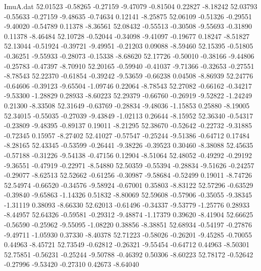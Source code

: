 \begin{filecontents}{ImuA.dat}
  52.01523   -0.58265   -0.27159   -9.47079   -0.81504    0.22827   -8.18242
  52.03793   -0.55633   -0.27159   -9.48635   -0.74634    0.12141   -8.25875
  52.06109   -0.51326   -0.29551   -9.40020   -0.54789    0.11378   -8.36561
  52.08432   -0.55513   -0.30508   -9.55693   -0.31890    0.11378   -8.46484
  52.10728   -0.52044   -0.34098   -9.41097   -0.19677    0.18247   -8.51827
  52.13044   -0.51924   -0.39721   -9.49951   -0.21203    0.09088   -8.59460
  52.15395   -0.51805   -0.36251   -9.55933   -0.28073   -0.15338   -8.68620
  52.17726   -0.50010   -0.38166   -9.44806   -0.25783   -0.47397   -8.70910
  52.20165   -0.59940   -0.41037   -9.71366   -0.32653   -0.27551   -8.78543
  52.22370   -0.61854   -0.39242   -9.53659   -0.66238    0.04508   -8.86939
  52.24776   -0.64606   -0.39123   -9.65504   -1.09746    0.22064   -8.78543
  52.27082   -0.66162   -0.34217   -9.53300   -1.28829    0.28933   -8.60223
  52.29379   -0.66760   -0.26919   -9.52822   -1.24249    0.21300   -8.33508
  52.31649   -0.63769   -0.28834   -9.48036   -1.15853    0.25880   -8.19005
  52.34015   -0.55035   -0.27039   -9.43849   -1.02113    0.26644   -8.15952
  52.36340   -0.54317   -0.23809   -9.48395   -0.89137    0.19011   -8.21295
  52.38670   -0.52642   -0.22732   -9.31885   -0.72345    0.15957   -8.27402
  52.41027   -0.57547   -0.25244   -9.51386   -0.64712    0.17484   -8.28165
  52.43345   -0.53599   -0.26441   -9.38226   -0.39523    0.30460   -8.38088
  52.45635   -0.57188   -0.31226   -9.54138   -0.47156    0.12904   -8.51064
  52.48052   -0.49292   -0.29192   -9.36551   -0.47919   -0.22971   -8.54880
  52.50359   -0.55394   -0.28834   -9.51626   -0.24257   -0.29077   -8.62513
  52.52662   -0.61256   -0.30987   -9.58684   -0.52499    0.19011   -8.74726
  52.54974   -0.66520   -0.34576   -9.58924   -0.67001    0.35803   -8.83122
  52.57296   -0.63529   -0.39840   -9.65863   -1.14326    0.51832   -8.80069
  52.59608   -0.57906   -0.35055   -9.38345   -1.31119    0.38093   -8.66330
  52.62013   -0.61496   -0.34337   -9.53779   -1.25776    0.28933   -8.44957
  52.64326   -0.59581   -0.29312   -9.48874   -1.17379    0.39620   -8.41904
  52.66625   -0.56590   -0.25962   -9.55095   -1.08220    0.38856   -8.38851
  52.68934   -0.54197   -0.27876   -9.49711   -1.05930    0.37330   -8.40378
  52.71223   -0.58026   -0.26201   -9.45285   -0.70055    0.44963   -8.45721
  52.73549   -0.62812   -0.26321   -9.55454   -0.64712    0.44963   -8.50301
  52.75851   -0.56231   -0.25244   -9.50788   -0.46392    0.50306   -8.60223
  52.78172   -0.52642   -0.27996   -9.53420   -0.27310    0.42673   -8.64040

\end{filecontents}
